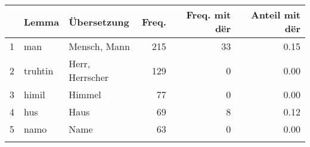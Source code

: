 \begin{tabular}{rllrrr}
  \lsptoprule
 & Lemma & Übersetzung & Freq. & Freq. mit dër & Anteil mit dër \\ 
  \midrule
1 & man & Mensch, Mann & 215 &  33 & 0.15 \\ 
  2 & truhtin & Herr, Herrscher & 129 &   0 & 0.00 \\ 
  3 & himil & Himmel &  77 &   0 & 0.00 \\ 
  4 & hus & Haus &  69 &   8 & 0.12 \\ 
  5 & namo & Name &  63 &   0 & 0.00 \\ 
   \lspbottomrule
\end{tabular}
